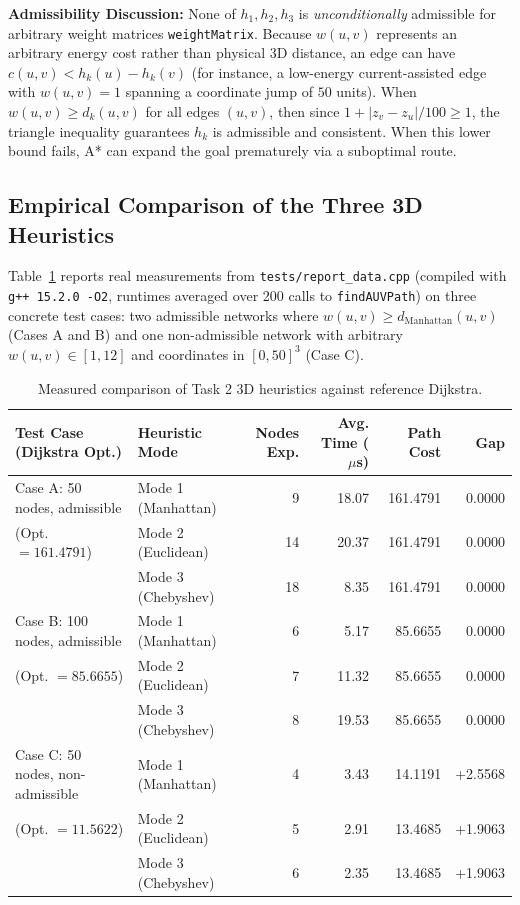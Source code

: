 \documentclass[11pt,a4paper]{article}
\begin{document}
\textbf{Admissibility Discussion:} None of $h_1, h_2, h_3$ is \emph{unconditionally} admissible for arbitrary weight matrices \texttt{weightMatrix}. Because $w(u, v)$ represents an arbitrary energy cost rather than physical 3D distance, an edge can have $c(u,v) < h_k(u) - h_k(v)$ (for instance, a low-energy current-assisted edge with $w(u,v) = 1$ spanning a coordinate jump of $50$ units). When $w(u,v) \ge d_k(u,v)$ for all edges $(u,v)$, then since $1 + |z_v - z_u|/100 \ge 1$, the triangle inequality guarantees $h_k$ is admissible and consistent. When this lower bound fails, A* can expand the goal prematurely via a suboptimal route.

\subsection{Empirical Comparison of the Three 3D Heuristics}
Table~\ref{tab:task2-bench} reports real measurements from \texttt{tests/report\_data.cpp} (compiled with \texttt{g++ 15.2.0 -O2}, runtimes averaged over 200 calls to \texttt{findAUVPath}) on three concrete test cases: two admissible networks where $w(u,v) \ge d_{\text{Manhattan}}(u,v)$ (Cases A and B) and one non-admissible network with arbitrary $w(u,v) \in [1, 12]$ and coordinates in $[0, 50]^3$ (Case C).

\begin{table}[h]
\centering
\caption{Measured comparison of Task 2 3D heuristics against reference Dijkstra.}
\label{tab:task2-bench}
\begin{tabular}{@{}l l r r r r@{}}
\toprule
Test Case (Dijkstra Opt.) & Heuristic Mode & Nodes Exp. & Avg. Time ($\mu$s) & Path Cost & Gap \\
\midrule
Case A: 50 nodes, admissible & Mode 1 (Manhattan) & 9  & 18.07 & 161.4791 & 0.0000 \\
(Opt. $= 161.4791$)          & Mode 2 (Euclidean) & 14 & 20.37 & 161.4791 & 0.0000 \\
                             & Mode 3 (Chebyshev) & 18 &  8.35 & 161.4791 & 0.0000 \\
\midrule
Case B: 100 nodes, admissible & Mode 1 (Manhattan) & 6 &  5.17 &  85.6655 & 0.0000 \\
(Opt. $= 85.6655$)            & Mode 2 (Euclidean) & 7 & 11.32 &  85.6655 & 0.0000 \\
                              & Mode 3 (Chebyshev) & 8 & 19.53 &  85.6655 & 0.0000 \\
\midrule
Case C: 50 nodes, non-admissible & Mode 1 (Manhattan) & 4 & 3.43 & 14.1191 & +2.5568 \\
(Opt. $= 11.5622$)               & Mode 2 (Euclidean) & 5 & 2.91 & 13.4685 & +1.9063 \\
                                 & Mode 3 (Chebyshev) & 6 & 2.35 & 13.4685 & +1.9063 \\
\bottomrule
\end{tabular}
\end{table}
\end{document}

